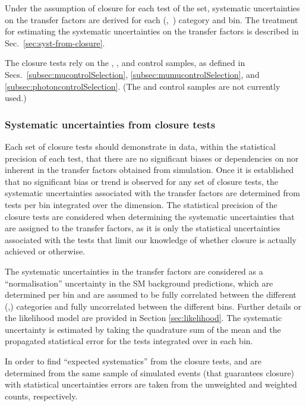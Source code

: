 Under the assumption of closure for each test of the set,
systematic uncertainties on the transfer factors are derived for each
(\njet,~\nb) category and \scalht bin. The treatment for estimating
the systematic uncertainties on the transfer factors is described in
Sec.~\ref{sec:syst-from-closure}.

The closure tests rely on the \mj, \mmj, and \gj control samples,
as defined in Secs.~\ref{subsec:mucontrolSelection},
\ref{subsec:mumucontrolSelection}, and
\ref{subsec:photoncontrolSelection}. (The \ej and \eej control samples
are not currently used.)

\subsubsection{Systematic uncertainties from closure tests\label{sec:syst-from-closure}}

Each set of closure tests should demonstrate in data, within the
statistical precision of each test, that there are no significant
biases or dependencies on \njet nor \scalht inherent in the transfer
factors obtained from simulation. 
Once it is established that no significant bias or trend is observed
for any set of closure tests, the systematic uncertainties associated
with the transfer factors are determined from tests per \scalht bin
integrated over the \njet dimension. The statistical precision of the 
closure tests are considered
when determining the systematic uncertainties that are assigned to the
transfer factors, as it is only the statistical uncertainties
associated with the tests that limit our knowledge of whether closure
is actually achieved or otherwise. 

The systematic uncertainties in the transfer factors are considered as
a ``normalisation'' uncertainty in the SM background predictions,
which are determined per \scalht bin and are
assumed to be fully correlated between the different (\njet,\nb)
categories and fully uncorrelated between the different \scalht bins. 
Further details or the likelihood model
are provided in Section \ref{sec:likelihood}. The systematic
uncertainty is estimated by taking the quadrature sum of the 
mean and the propagated statistical error for the tests integrated
over \njet in each \scalht bin.

In order to find ``expected systematics'' from the closure tests, \nobs and \npre are
determined from the same sample of simulated events (that guarantees
closure) with statistical uncertainties errors are taken from the
unweighted and weighted counts, respectively. 

